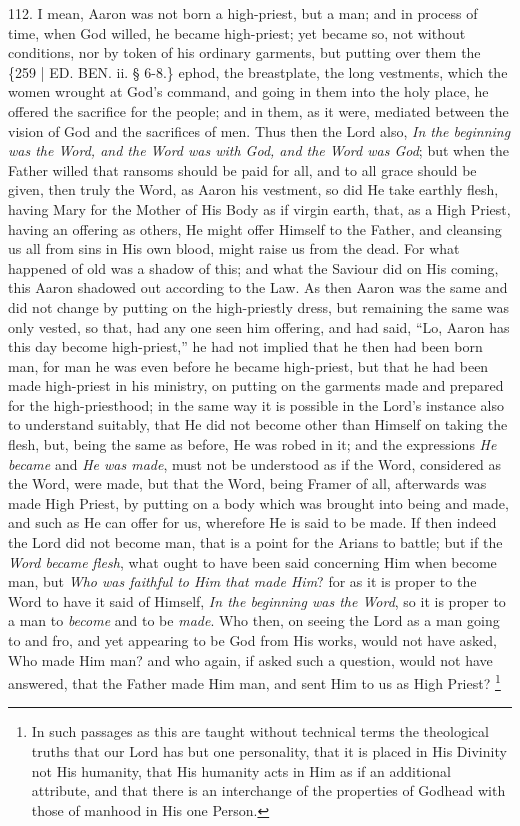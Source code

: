 112. I mean, Aaron was not
born a high-priest, but a man; and in process of time, when God
willed, he became high-priest; yet became so, not without conditions,
nor by token of his ordinary garments, but putting over them the \{259
| ED.
BEN.
ii. § 6-8.\} ephod, the breastplate, the long vestments, which the
women wrought at God's command, and going in them into the holy place,
he offered the sacrifice for the people; and in them, as it were,
mediated between the vision of God and the sacrifices of men. Thus
then the Lord also, \emph{In the beginning was the Word, and the Word was
with God, and the Word was God}; but when the Father willed that
ransoms should be paid for all, and to all grace should be given, then
truly the Word, as Aaron his vestment, so did He take earthly flesh,
having Mary for the Mother of His Body as if virgin earth, that, as a
High Priest, having an offering as others, He might offer Himself to
the Father, and cleansing us all from sins in His own blood, might
raise us from the dead. For what happened of old was a shadow of this;
and what the Saviour did on His coming, this Aaron shadowed out
according to the Law. As then Aaron was the same and did not change by
putting on the high-priestly dress, but remaining the same was only
vested, so that, had any one seen him offering, and had said, ``Lo,
Aaron has this day become high-priest,'' he had not implied that he
then had been born man, for man he was even before he became
high-priest, but that he had been made high-priest in his ministry, on
putting on the garments made and prepared for the high-priesthood; in
the same way it is possible in the Lord's instance also to understand
suitably, that He did not become other than Himself on taking the
flesh, but, being the same as before, He was robed in it; and the
expressions \emph{He became} and \emph{He was made}, must not be
understood as if the Word, considered as the Word, were made, but that
the Word, being Framer of all, afterwards was made High Priest, by
putting on a body which was brought into being and made, and such as
He can offer for us, wherefore He is said to be made. If then indeed
the Lord did not become man, that is a point for the Arians to battle;
but if the \emph{Word became} \emph{flesh}, what ought to have
been said concerning Him when become man, but \emph{Who was faithful to
Him that made Him}? for as it is proper to the Word to have it said
of Himself, \emph{In the beginning was the Word}, so it is proper to a
man to \emph{become} and to be \emph{made}. Who then, on seeing the
Lord as a man going to and fro, and yet appearing to be God from His
works, would not have asked, Who made Him man? and who again, if asked
such a question, would not have answered, that the Father made Him
man, and sent Him to us as High Priest? \footnote{In such passages as this are taught without technical terms the
theological truths that our Lord has but one personality, that it is
placed in His Divinity not His humanity, that His humanity acts in Him
as if an additional attribute, and that there is an interchange of the
properties of Godhead with those of manhood in His one Person.}

